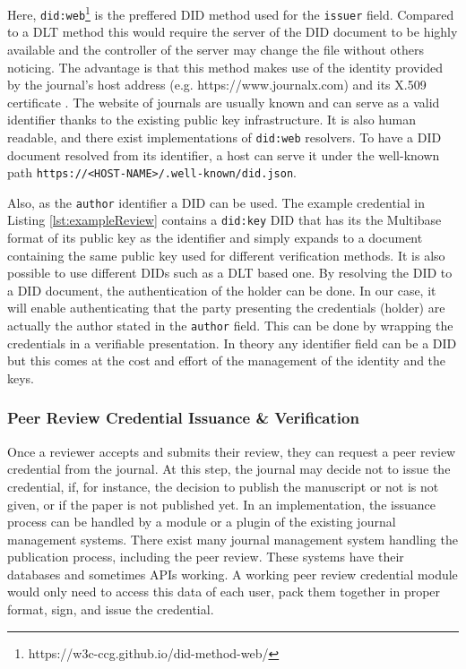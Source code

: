 Here, \lstinline{did:web}\footnote{https://w3c-ccg.github.io/did-method-web/} is the preffered \acrshort{DID} method used for the \lstinline{issuer} field. Compared to a \acrshort{DLT} method this would require the server of the \acrshort{DID} document to be highly available and the controller of the server may change the file without others noticing. The advantage is that this method makes use of the identity provided by the journal's host address (e.g. https://www.journalx.com) and its X.509 certificate \parencite{Barclay.6Nis2020}. The website of journals are usually known and can serve as a valid identifier thanks to the existing public key infrastructure. It is also human readable, and there exist implementations of \lstinline{did:web} resolvers. To have a \acrshort{DID} document resolved from its identifier, a host can serve it under the well-known path \parencite{rfc5785} \lstinline{https://<HOST-NAME>/.well-known/did.json}. 

Also, as the \lstinline{author} identifier a \acrshort{DID} can be used. The example credential in Listing \ref{lst:exampleReview} contains a \lstinline{did:key} \parencite{did-key} \acrshort{DID} that has its the Multibase format \parencite{multiformats-multibase-03} of its public key as the identifier and simply expands to a document containing the same public key used for different verification methods. It is also possible to use different \acrshort{DID}s such as a \acrshort{DLT} based one. By resolving the \acrshort{DID} to a \acrshort{DID} document, the authentication of the holder can be done. In our case, it will enable authenticating that the party presenting the credentials (holder) are actually the author stated in the \lstinline{author} field. This can be done by wrapping the credentials in a verifiable presentation. In theory any identifier field can be a \acrshort{DID} but this comes at the cost and effort of the management of the identity and the keys.



\subsubsection{Peer Review Credential Issuance \& Verification}

Once a reviewer accepts and submits their review, they can request a peer review credential from the journal. At this step, the journal may decide not to issue the credential, if, for instance, the decision to publish the manuscript or not is not given, or if the paper is not published yet. In an implementation, the issuance process can be handled by a module or a plugin of the existing journal management systems. There exist many journal management system handling the publication process, including the peer review. These systems have their databases and sometimes \acrshort{API}s working. A working peer review credential module would only need to access this data of each user, pack them together in proper format, sign, and issue the credential. 

